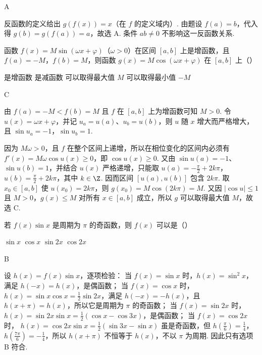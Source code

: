 \begin{answer}
A
\end{answer}

\begin{solution}
反函数的定义给出 \(g(f(x))=x\)（在 \(f\) 的定义域内）. 由题设 \(f(a)=b\)，代入得
\(g(b)=g(f(a))=a\)，故选 A. 条件 \(ab\neq0\) 不影响这一反函数关系.
\end{solution}

\begin{problem}
函数 \(f(x)=M\sin(\omega x+\varphi)\)（\(\omega>0\)）在区间 \([a,b]\) 上是增函数，且 \(f(a)=-M\)，\(f(b)=M\)，则函数 \(g(x)=M\cos(\omega x+\varphi)\) 在 \([a,b]\) 上（\quad）

\choices
    {是增函数}
    {是减函数}
    {可以取得最大值 \(M\)}
    {可以取得最小值 \(-M\)}
\end{problem}

\begin{answer}
C
\end{answer}

\begin{solution}
由 \(f(a)=-M<f(b)=M\) 且 \(f\) 在 \([a,b]\) 上为增函数可知 \(M>0\). 令 \(u(x)=\omega x+\varphi\)，并记 \(u_a=u(a)\)、\(u_b=u(b)\)，则 \(u\) 随 \(x\) 增大而严格增大，且
\(\sin u_a=-1\)，\(\sin u_b=1\).

因为 \(M\omega>0\)，且 \(f\) 在整个区间上递增，所以在相位变化的区间内必须有
\(f'(x)=M\omega\cos u(x)\geqslant0\)，即 \(\cos u(x)\geqslant0\). 又由 \(\sin u(a)=-1\)、\(\sin u(b)=1\)，并结合 \(u(x)\) 严格递增，只能取
\(u(a)=-\frac{\pi}{2}+2k\pi\)，\(u(b)=\frac{\pi}{2}+2k\pi\)，其中 \(k\in\Z\). 因而区间 \([u(a),u(b)]\) 包含 \(2k\pi\). 取 \(x_0\in[a,b]\) 使 \(u(x_0)=2k\pi\)，则
\(g(x_0)=M\cos(2k\pi)=M\). 又因 \(|\cos u|\leqslant1\) 且 \(M>0\)，\(g(x)\leqslant M\) 对所有 \(x\in[a,b]\) 成立，所以 \(g\) 可以取得最大值 \(M\)，故选 C.
\end{solution}

\begin{problem}
若 \(f(x)\sin x\) 是周期为 \(\pi\) 的奇函数，则 \(f(x)\) 可以是（\quad）

\choices
    {\(\sin x\)}
    {\(\cos x \)}
    {\(\sin 2x \)}
    {\(\cos 2x \)}
\end{problem}

\begin{answer}
B
\end{answer}

\begin{solution}
设 \(h(x)=f(x)\sin x\)，逐项检验：
当 \(f(x)=\sin x\) 时，\(h(x)=\sin^2x\)，满足 \(h(-x)=h(x)\)，是偶函数；
当 \(f(x)=\cos x\) 时，
\(h(x)=\sin x\cos x=\frac{1}{2}\sin 2x\)，满足 \(h(-x)=-h(x)\)，且 \(h(x+\pi)=h(x)\)，所以它是周期为 \(\pi\) 的奇函数；
当 \(f(x)=\sin2x\) 时，
\(h(x)=\sin2x\sin x=\frac{1}{2}(\cos x-\cos3x)\)，是偶函数；
当 \(f(x)=\cos2x\) 时，
\(h(x)=\cos2x\sin x=\frac{1}{2}(\sin3x-\sin x)\) 虽是奇函数，但
\(h(\frac{\pi}{6})=\frac{1}{4}\)，\(h(\frac{7\pi}{6})=-\frac{1}{4}\)，所以 \(h(x+\pi)\) 不恒等于 \(h(x)\)，不以 \(\pi\) 为周期. 因此只有选项 B 符合.
\end{solution}

